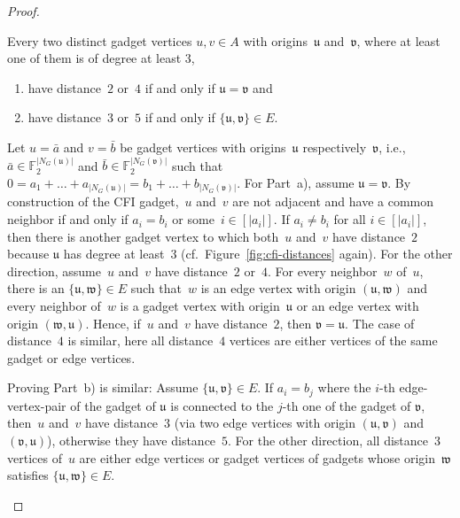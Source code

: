 \documentclass[]{lmcs}
\newcommand{\FF}{\mathbb{F}}
\newcommand{\set}[1]{\lbrace #1 \rbrace}
\newcommand{\tup}[1]{\bar{#1}}
\newcommand{\StructV}{A}
\newcommand{\vertA}{u}
\newcommand{\vertB}{v}
\newcommand{\vertC}{w}
\newcommand{\neighbors}[2]{N_{#1}(#2)}
\newcommand{\bVertA}{\mathfrak{u}}
\newcommand{\bVertB}{\mathfrak{v}}
\newcommand{\bVertC}{\mathfrak{w}}
\newcommand{\tlength}[1]{| #1 |}
\newenvironment{claimproof}[1][\proofname]{\begin{claimprooftemp}[#1]\renewcommand*{\qedsymbol}{\(\dashv\)}}{\end{claimprooftemp}}
\begin{document}
\begin{proof}
	\begin{clm}
		\label{clm:define-adjacent-gadgets}
		Every two distinct gadget vertices $\vertA, \vertB \in \StructV$ 
		with origins~$\bVertA$ and~$\bVertB$, where at least one of them is of degree at least $3$,
		\begin{enumerate}[label=(\alph*)]
			\item have distance~$2$ or~$4$ if and only if $\bVertA = \bVertB$ and 
			\item have distance~$3$ or~$5$ if and only if $\set{\bVertA,\bVertB} \in E$. 
		\end{enumerate}
	\end{clm}
	\begin{claimproof}
		Let $\vertA=\tup{a}$ and $\vertB=\tup{b}$ be gadget vertices
		with origins~$\bVertA$ respectively~$\bVertB$, i.e., $\tup{a} \in \FF_2^{|\neighbors{G}{\bVertA}|}$ and $\tup{b} \in \FF_2^{|\neighbors{G}{\bVertB}|}$ such that $0 = a_1+\dots +a_{|\neighbors{G}{\bVertA}|} = b_1+\dots + b_{|\neighbors{G}{\bVertB}|}$.
		For Part~a),
		assume $\bVertA = \bVertB$.
		By construction of the CFI gadget,~$\vertA$ and~$\vertB$
		are not adjacent and have a common neighbor if and only if $a_i = b_i$ or some~$i \in [\tlength{a_i}]$.
		If $a_i \neq b_i$ for all $i\in [\tlength{a_i}]$,
		then there is another gadget vertex
		to which both~$\vertA$ and~$\vertB$ have distance~$2$
		because $\bVertA$ has degree at least~$3$ (cf.~Figure~\ref{fig:cfi-distances} again).
		For the other direction, assume~$\vertA$ and~$\vertB$ have distance~$2$ or~$4$.
		For every neighbor~$\vertC$ of~$\vertA$,
		there is an $\set{\bVertA,\bVertC} \in E$
		such that~$\vertC$ is an edge vertex with origin $(\bVertA,\bVertC)$
		and every neighbor of~$\vertC$ is a gadget vertex with origin~$\bVertA$
		or an edge vertex with origin $(\bVertC,\bVertA)$.
		Hence, if~$\vertA$ and~$\vertB$ have distance~$2$,
		then $\bVertB = \bVertA$.
		The case of distance~$4$ is similar,
		here all distance~$4$ vertices are either vertices of the same gadget or edge vertices.
		
		Proving Part~b) is similar:
		Assume $\set{\bVertA,\bVertB} \in E$.
		If $a_i = b_j$ where the $i$-th edge-vertex-pair of the gadget of $\bVertA$ is connected to the $j$-th one of the gadget of $\bVertB$,
		then~$\vertA$ and~$\vertB$ have distance~$3$
		(via two edge vertices with origin $(\bVertA,\bVertB)$ and $(\bVertB,\bVertA)$),
		otherwise they have distance~$5$.
		For the other direction, all distance~$3$ vertices of~$\vertA$
		are either edge vertices or gadget vertices of gadgets whose origin~$\bVertC$ satisfies $\set{\bVertA,\bVertC} \in E$.
	\end{claimproof}
	

\end{proof}
\end{document}
